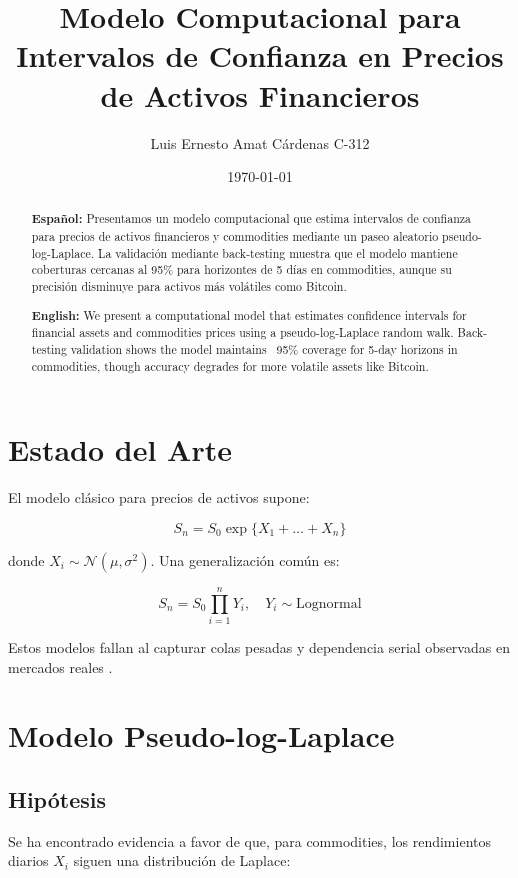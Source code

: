 \documentclass{article}
\title{Modelo Computacional para Intervalos de Confianza en Precios de Activos Financieros}
\author{Luis Ernesto Amat Cárdenas C-312}
\date{\today}
\begin{document}
\maketitle

\begin{abstract}
\textbf{Español:} Presentamos un modelo computacional que estima intervalos de confianza para precios de activos financieros y commodities mediante un paseo aleatorio pseudo-log-Laplace. La validación mediante back-testing muestra que el modelo mantiene coberturas cercanas al 95\% para horizontes de 5 días en commodities, aunque su precisión disminuye para activos más volátiles como Bitcoin.

\textbf{English:} We present a computational model that estimates confidence intervals for financial assets and commodities prices using a pseudo-log-Laplace random walk. Back-testing validation shows the model maintains ~95\% coverage for 5-day horizons in commodities, though accuracy degrades for more volatile assets like Bitcoin.
\end{abstract}

\section{Estado del Arte}
El modelo clásico para precios de activos \cite{Ross2013} supone:

\begin{equation}
S_n = S_0 \exp\{X_1 + \dots + X_n\}
\end{equation}

donde $X_i \sim \mathcal{N}(\mu,\sigma^2)$. Una generalización común es:

\begin{equation}
S_n = S_0 \prod_{i=1}^n Y_i,\quad Y_i \sim \text{Lognormal}
\end{equation}

Estos modelos fallan al capturar colas pesadas y dependencia serial observadas en mercados reales \cite{Sharpe}.

\section{Modelo Pseudo-log-Laplace}

\subsection{Hipótesis}
Se ha encontrado evidencia a favor de que, para commodities, los rendimientos diarios $X_i$ siguen una distribución de Laplace:
\end{document}
